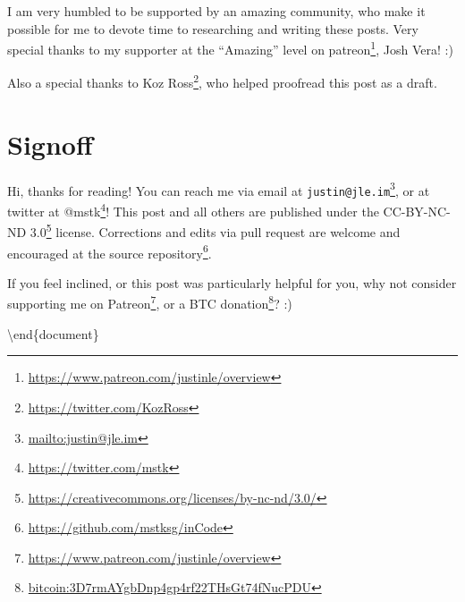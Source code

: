 \documentclass[]{article}
\renewcommand{\href}[2]{#2\footnote{\url{#1}}}
\begin{document}
I am very humbled to be supported by an amazing community, who make it possible
for me to devote time to researching and writing these posts. Very special
thanks to my supporter at the ``Amazing'' level on
\href{https://www.patreon.com/justinle/overview}{patreon}, Josh Vera! :)

Also a special thanks to \href{https://twitter.com/KozRoss}{Koz Ross}, who
helped proofread this post as a draft.

\section{Signoff}\label{signoff}

Hi, thanks for reading! You can reach me via email at
\href{mailto:justin@jle.im}{\nolinkurl{justin@jle.im}}, or at twitter at
\href{https://twitter.com/mstk}{@mstk}! This post and all others are published
under the \href{https://creativecommons.org/licenses/by-nc-nd/3.0/}{CC-BY-NC-ND
3.0} license. Corrections and edits via pull request are welcome and encouraged
at \href{https://github.com/mstksg/inCode}{the source repository}.

If you feel inclined, or this post was particularly helpful for you, why not
consider \href{https://www.patreon.com/justinle/overview}{supporting me on
Patreon}, or a \href{bitcoin:3D7rmAYgbDnp4gp4rf22THsGt74fNucPDU}{BTC donation}?
:)

\textbackslash end\{document\}
\end{document}
